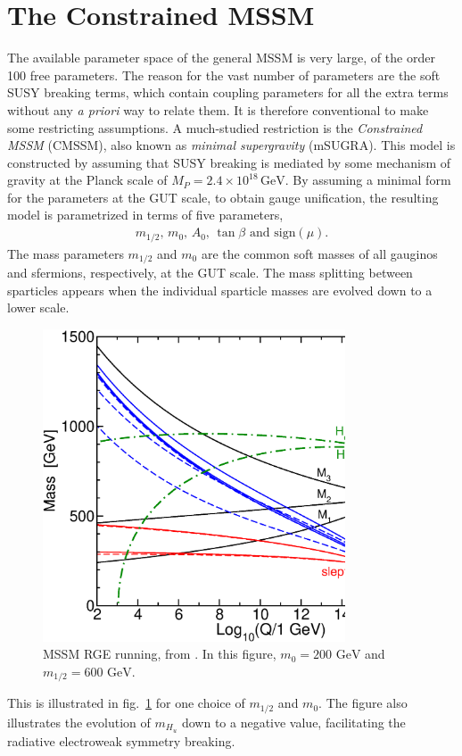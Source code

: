 \documentclass[twoside,english]{uiofysmaster}
\begin{document}
\section{The Constrained MSSM}
The available parameter space of the general MSSM is very large, of the order 100 free parameters. The reason for the vast number of parameters are the soft SUSY breaking terms, which contain coupling parameters for all the extra terms without any {\it a priori} way to relate them. It is therefore conventional to make some restricting assumptions. A much-studied restriction is the {\it Constrained MSSM} (CMSSM), also known as {\it minimal supergravity} (mSUGRA). This model is constructed by assuming that SUSY breaking is mediated by some mechanism of gravity at the Planck scale of $M_P = 2.4\times 10^{18} \, \mathrm{GeV}$. By assuming a minimal form for the parameters at the GUT scale, to obtain gauge unification, the resulting model is parametrized in terms of five parameters,
\begin{align}
	m_{1/2}, \, m_{0}, \, A_0, \, \tan\beta \,\, \mathrm{and} \,\, \mathrm{sign}(\mu).
\end{align}
The mass parameters $m_{1/2}$ and $m_0$ are the common soft masses of all gauginos and sfermions, respectively, at the GUT scale. The mass splitting between sparticles appears when the individual sparticle masses are evolved down to a lower scale.
\begin{figure}[hbt]
	\centering
	\includegraphics[width=0.8\textwidth]{figures/susyintro/MSSMrun.eps}
	\caption{MSSM RGE running, from \cite{Martin:1997ns}. In this figure, $m_0 = 200 \,\,\mathrm{GeV}$ and $m_{1/2}= 600 \,\,\mathrm{GeV}$.}
	\label{fig:mssm_rgerun}
\end{figure}
This is illustrated in fig.\ \ref{fig:mssm_rgerun} for one choice of $m_{1/2}$ and $m_0$. The figure also illustrates the evolution of $m_{H_u}$ down to a negative value, facilitating the radiative electroweak symmetry breaking.
\end{document}
